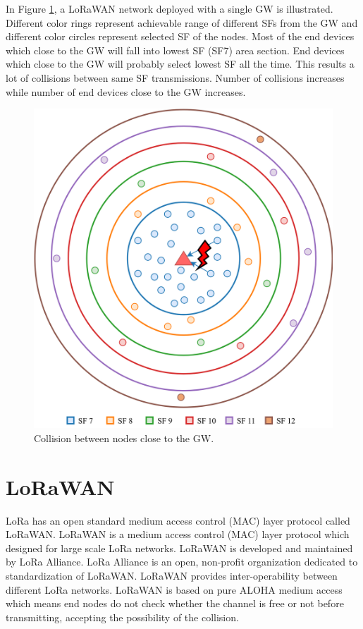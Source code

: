 \documentclass[conference]{IEEEtran}
\begin{document}
\par In Figure \ref{fig:collision}, a LoRaWAN network deployed with a single GW is illustrated. Different color rings represent achievable range of different SFs from the GW and different color circles represent selected SF of the nodes. Most of the end devices which close to the GW will fall into lowest SF (SF7) area section. End devices which close to the GW will probably select lowest SF all the time. This results a lot of collisions between same SF transmissions. Number of collisions increases while number of end devices close to the GW increases.

\begin{figure}
\centering
\includegraphics[width=\linewidth]{collision}
\caption{Collision between nodes close to the GW.}
\label{fig:collision}
\end{figure}


\section{LoRaWAN} \label{LoRaWAN}
\par LoRa has an open standard medium access control (MAC) layer protocol called LoRaWAN. LoRaWAN is a medium access control (MAC) layer protocol which designed for large scale LoRa networks. LoRaWAN is developed and maintained by LoRa Alliance. LoRa Alliance is an open, non-profit organization dedicated to standardization of LoRaWAN. LoRaWAN  provides inter-operability between different LoRa networks. LoRaWAN is based on pure ALOHA medium access which means end nodes do not check whether the channel is free or not before transmitting, accepting the possibility of the collision.
\end{document}
